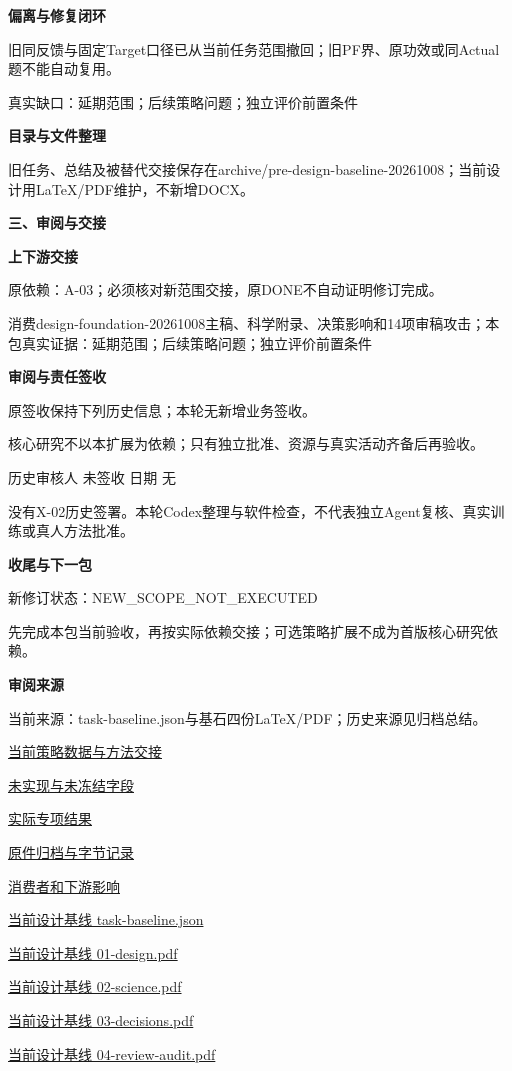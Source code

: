 \documentclass[11pt,a4paper]{article}
\newcommand{\reviewsection}[1]{\par\Needspace{5\baselineskip}\vspace{10pt}\begin{center}{\titlelatin\titlecjk\bfseries\fontsize{14}{20}\selectfont #1}\end{center}}
\newcommand{\reviewsubsection}[1]{\par\Needspace{4\baselineskip}\vspace{4pt}\begin{center}{\titlelatin\titlecjk\bfseries\fontsize{12}{18}\selectfont #1}\end{center}}
\begin{document}
\reviewsubsection{2.3 偏离与修复闭环}
旧同反馈与固定Target口径已从当前任务范围撤回；旧PF界、原功效或同Actual题不能自动复用。


真实缺口：延期范围；后续策略问题；独立评价前置条件


\reviewsubsection{2.4 目录与文件整理}
旧任务、总结及被替代交接保存在archive/\allowbreak{}pre-\allowbreak{}design-\allowbreak{}baseline-\allowbreak{}20261008；当前设计用LaTeX/\allowbreak{}PDF维护，不新增DOCX。


\reviewsection{三、审阅与交接}
\reviewsubsection{3.1 上下游交接}
原依赖：A-\allowbreak{}03；必须核对新范围交接，原DONE不自动证明修订完成。


消费design-\allowbreak{}foundation-\allowbreak{}20261008主稿、科学附录、决策影响和14项审稿攻击；本包真实证据：延期范围；后续策略问题；独立评价前置条件


\reviewsubsection{3.2 审阅与责任签收}
原签收保持下列历史信息；本轮无新增业务签收。


核心研究不以本扩展为依赖；只有独立批准、资源与真实活动齐备后再验收。


历史审核人 未签收    日期 无


没有X-\allowbreak{}02历史签署。本轮Codex整理与软件检查，不代表独立Agent复核、真实训练或真人方法批准。


\reviewsubsection{3.3 收尾与下一包}
新修订状态：NEW\_\allowbreak{}SCOPE\_\allowbreak{}NOT\_\allowbreak{}EXECUTED


先完成本包当前验收，再按实际依赖交接；可选策略扩展不成为首版核心研究依赖。


\reviewsubsection{3.4 审阅来源}
当前来源：task-\allowbreak{}baseline.json与基石四份LaTeX/\allowbreak{}PDF；历史来源见归档总结。


\href{file:///D:/Agent/srp/agent/tasks/X-02/outputs/current-policy.md}{当前策略数据与方法交接}


\href{file:///D:/Agent/srp/agent/tasks/X-02/outputs/current-policy.json}{未实现与未冻结字段}


\href{file:///D:/Agent/srp/agent/tasks/X-02/evidence/verification.json}{实际专项结果}


\href{file:///D:/Agent/srp/agent/tasks/X-02/archive/README.md}{原件归档与字节记录}


\href{file:///D:/Agent/srp/agent/tasks/X-02/evidence/consumer-impact.md}{消费者和下游影响}


\href{file:///D:/Agent/srp/agent/design/design-foundation-20261008/task-baseline.json}{当前设计基线 task-\allowbreak{}baseline.json}


\href{file:///D:/Agent/srp/agent/design/design-foundation-20261008/01-design.pdf}{当前设计基线 01-\allowbreak{}design.pdf}


\href{file:///D:/Agent/srp/agent/design/design-foundation-20261008/02-science.pdf}{当前设计基线 02-\allowbreak{}science.pdf}


\href{file:///D:/Agent/srp/agent/design/design-foundation-20261008/03-decisions.pdf}{当前设计基线 03-\allowbreak{}decisions.pdf}


\href{file:///D:/Agent/srp/agent/design/design-foundation-20261008/04-review-audit.pdf}{当前设计基线 04-\allowbreak{}review-\allowbreak{}audit.pdf}
\end{document}
